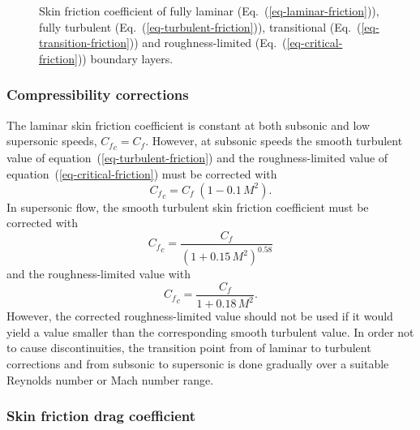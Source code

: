 \begin{figure}
\centering
{}
\caption{Skin friction coefficient of fully laminar
  (Eq.~(\ref{eq-laminar-friction})), fully turbulent
  (Eq.~(\ref{eq-turbulent-friction})), transitional
  (Eq.~(\ref{eq-transition-friction})) and roughness-limited
  (Eq.~(\ref{eq-critical-friction})) boundary layers.}
\label{fig-skinfriction-plot}
\end{figure}


\subsubsection{Compressibility corrections}

The laminar skin friction coefficient is constant at both subsonic and
low supersonic speeds, ${C_f}_c = C_f$.  However, at subsonic speeds
the smooth turbulent value of equation~(\ref{eq-turbulent-friction})
and the roughness-limited value of
equation~(\ref{eq-critical-friction}) must be corrected with
%
\begin{equation}
{C_f}_c = C_f\; (1-0.1\, M^2).
\end{equation}
%
In supersonic flow, the smooth turbulent skin friction coefficient
must be corrected with
%
\begin{equation}
{C_f}_c = \frac{C_f}{(1+0.15\, M^2)^{0.58}}
\end{equation}
%
and the roughness-limited value with
%
\begin{equation}
{C_f}_c = \frac{C_f}{1 + 0.18\, M^2}.
\end{equation}
%
However, the corrected roughness-limited value should not be used if
it would yield a value smaller than the corresponding smooth turbulent
value.  In order not to cause discontinuities, the transition point
from of laminar to turbulent corrections and from subsonic to
supersonic is done gradually over a suitable Reynolds number or Mach
number range.



\subsubsection{Skin friction drag coefficient}
\label{sec-skin-friction-drag}

